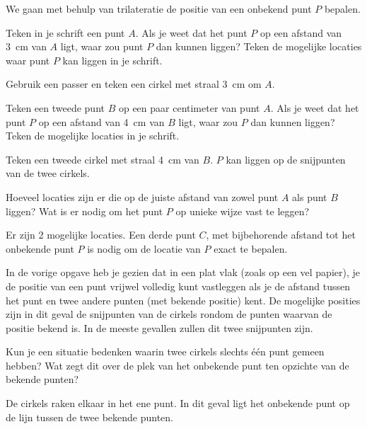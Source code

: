 \begin{opgave}
	We gaan met behulp van trilateratie de positie van een onbekend punt $P$ bepalen.
	\begin{subopgave}
		Teken in je schrift een punt $A$. Als je weet dat het punt $P$ op een afstand van 3~cm van $A$ ligt, waar zou punt $P$ dan kunnen liggen? Teken de mogelijke locaties waar punt $P$ kan liggen in je schrift.
		\begin{antwoord}
			Gebruik een passer en teken een cirkel met straal 3~cm om $A$.
		\end{antwoord}
	\end{subopgave}
	\begin{subopgave}
		Teken een tweede punt $B$ op een paar centimeter van punt $A$. Als je weet dat het punt $P$ op een afstand van 4~cm van $B$ ligt, waar zou $P$ dan kunnen liggen? Teken de mogelijke locaties in je schrift. 
		\begin{antwoord}
			Teken een tweede cirkel met straal 4~cm van $B$. $P$ kan liggen op de snijpunten van de twee cirkels.
		\end{antwoord}
	\end{subopgave}
	\begin{subopgave}
		Hoeveel locaties zijn er die op de juiste afstand van zowel punt $A$ als punt $B$ liggen? Wat is er nodig om het punt $P$ op unieke wijze vast te leggen?
		\begin{antwoord}
			Er zijn 2 mogelijke locaties. Een derde punt $C$, met bijbehorende afstand tot het onbekende punt $P$ is nodig om de locatie van $P$ exact te bepalen.
		\end{antwoord}
	\end{subopgave}
\end{opgave}

In de vorige opgave heb je gezien dat in een plat vlak (zoals op een vel papier), je de positie van een punt vrijwel volledig kunt vastleggen als je de afstand tussen het punt en twee andere punten (met bekende positie) kent. De mogelijke posities zijn in dit geval de snijpunten van de cirkels rondom de punten waarvan de positie bekend is. In de meeste gevallen zullen dit twee snijpunten zijn.

\begin{opgave}
	Kun je een situatie bedenken waarin twee cirkels slechts \'e\'en punt gemeen hebben? Wat zegt dit over de plek van het onbekende punt ten opzichte van de bekende punten?
	\begin{antwoord}
		De cirkels raken elkaar in het ene punt. In dit geval ligt het onbekende punt op de lijn tussen de twee bekende punten.
	\end{antwoord}
\end{opgave}

